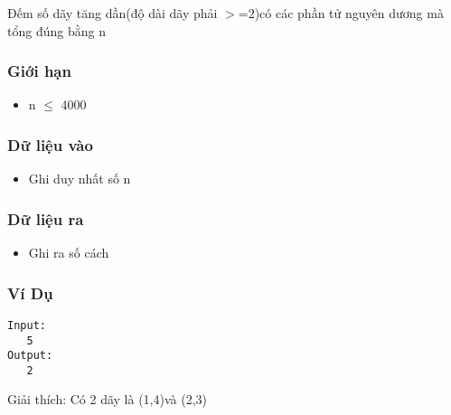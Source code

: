 

Đếm số dãy tăng dần(độ dài dãy phải $>$=2)có các phần tử nguyên dương mà tổng đúng bằng n

\subsubsection{Giới hạn}
\begin{itemize}
	\item n $\le$ 4000
\end{itemize}

\subsubsection{Dữ liệu vào}
\begin{itemize}
	\item Ghi duy nhất số n
\end{itemize}

\subsubsection{Dữ liệu ra}
\begin{itemize}
	\item Ghi ra số cách
\end{itemize}

\subsubsection{Ví Dụ}
\begin{verbatim}
Input:
   5
Output:
   2
\end{verbatim}

Giải thích: Có 2 dãy là (1,4)và (2,3)
